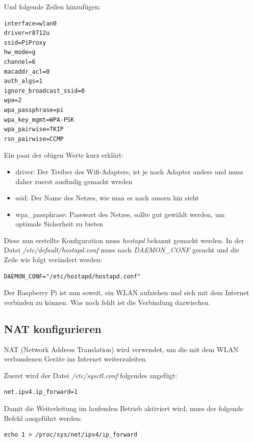 Und folgende Zeilen hinzufügen:

\begin{lstlisting}
interface=wlan0
driver=r8712u
ssid=PiProxy
hw_mode=g
channel=6
macaddr_acl=0
auth_algs=1
ignore_broadcast_ssid=0
wpa=2
wpa_passphrase=pi
wpa_key_mgmt=WPA-PSK
wpa_pairwise=TKIP
rsn_pairwise=CCMP
\end{lstlisting}

Ein paar der obigen Werte kurz erklärt: 
\begin{itemize}
\item driver: Der Treiber des Wifi-Adapters, ist je nach Adapter anders und muss daher zuerst ausfindig gemacht werden
\item ssid: Der Name des Netzes, wie man es nach aussen hin sieht
\item wpa\_passphrase: Passwort des Netzes, sollte gut gewählt werden, um optimale Sicherheit zu bieten
\end{itemize}


Diese nun erstellte Konfiguration muss \textit{hostapd} bekannt gemacht werden. In der Datei \textit{/etc/default/hostapd.conf} muss nach \textit{DAEMON\_CONF} gesucht und die Zeile wie folgt verändert werden:

\begin{lstlisting}
DAEMON_CONF="/etc/hostapd/hostapd.conf"
\end{lstlisting}

Der Raspberry Pi ist nun soweit, ein WLAN aufziehen und sich mit dem Internet verbinden zu können. Was noch fehlt ist die Verbindung dazwischen.

\subsection{NAT konfigurieren}
NAT (Network Address Translation) wird verwendet, um die mit dem WLAN verbundenen Geräte ins Internet weiterzuleiten.

Zuerst wird der Datei \textit{/etc/sysctl.conf} folgendes angefügt:

\begin{lstlisting}
net.ipv4.ip_forward=1
\end{lstlisting}

Damit die Weiterleitung im laufenden Betrieb aktiviert wird, muss der folgende Befehl ausgeführt werden:

\begin{lstlisting}
echo 1 > /proc/sys/net/ipv4/ip_forward
\end{lstlisting}

